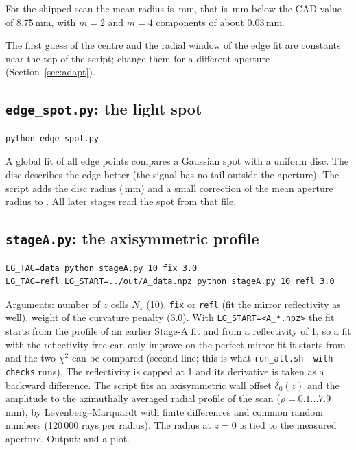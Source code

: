 \documentclass[11pt,a4paper]{article}
\newcommand{\code}[1]{\texttt{#1}}
\begin{document}
For the shipped scan the mean radius is \RAp\,mm, that is \RApDiff\,mm below the CAD value of
8.75\,mm, with $m=2$ and $m=4$ components of about 0.03\,mm.

The first guess of the centre and the radial window of the edge fit are constants near the top of
the script; change them for a different aperture (Section~\ref{sec:adapt}).

\subsection{\texttt{edge\_spot.py}: the light spot}

\begin{lstlisting}
python edge_spot.py
\end{lstlisting}
A global fit of all edge points compares a Gaussian spot with a uniform disc. The disc describes the
edge better (the signal has no tail outside the aperture). The script adds the disc radius
(\SpotR\,mm) and a small correction of the mean aperture radius to . All later
stages read the spot from that file.

\subsection{\texttt{stageA.py}: the axisymmetric profile}

\begin{lstlisting}
LG_TAG=data python stageA.py 10 fix 3.0
LG_TAG=refl LG_START=../out/A_data.npz python stageA.py 10 refl 3.0
\end{lstlisting}
Arguments: number of $z$ cells $N_z$ (10), \code{fix} or \code{refl} (fit the mirror reflectivity as
well), weight of the curvature penalty (3.0). With \code{LG\_START=<A\_*.npz>} the fit starts from the
profile of an earlier Stage-A fit and from a reflectivity of 1, so a fit with the reflectivity free
can only improve on the perfect-mirror fit it starts from and the two $\chi^2$ can be compared
(second line; this is what \code{run\_all.sh --with-checks} runs). The reflectivity is capped at 1 and
its derivative is taken as a backward difference. The script fits an axisymmetric wall offset
$\delta_0(z)$ and the amplitude to the azimuthally averaged radial profile of the scan
($\rho=0.1\ldots7.9$\,mm), by Levenberg--Marquardt with finite differences and common random numbers
(120\,000 rays per radius). The radius at $z=0$ is tied to the measured aperture. Output:
 and a plot.
\end{document}
